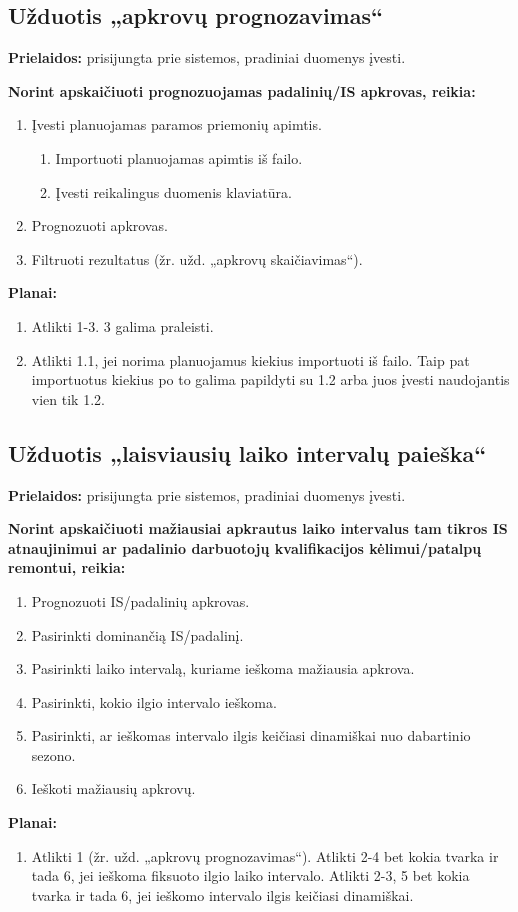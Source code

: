\subsection{Užduotis „apkrovų prognozavimas“}

\textbf{Prielaidos:} prisijungta prie sistemos, pradiniai duomenys įvesti.

\textbf{Norint apskaičiuoti prognozuojamas padalinių/IS apkrovas, reikia:}
\begin{enumerate}
  \item Įvesti planuojamas paramos priemonių apimtis.
  \begin{enumerate}
    \item Importuoti planuojamas apimtis iš failo.
    \item Įvesti reikalingus duomenis klaviatūra.
  \end{enumerate}
  
  \item Prognozuoti apkrovas.
  \item Filtruoti rezultatus (žr. užd. „apkrovų skaičiavimas“).
\end{enumerate}

\vspace{1cm}
\textbf{Planai:}
\begin{enumerate}
  \item Atlikti 1-3. 3 galima praleisti.
  \item Atlikti 1.1, jei norima planuojamus kiekius importuoti iš failo. Taip pat importuotus
  kiekius po to galima papildyti su 1.2 arba juos įvesti naudojantis vien tik 1.2.
\end{enumerate}

\subsection{Užduotis „laisviausių laiko intervalų paieška“}

\textbf{Prielaidos:} prisijungta prie sistemos, pradiniai duomenys įvesti.

\textbf{Norint apskaičiuoti mažiausiai apkrautus laiko intervalus tam tikros IS atnaujinimui ar
padalinio darbuotojų kvalifikacijos kėlimui/patalpų remontui, reikia:}
\begin{enumerate}
  \item Prognozuoti IS/padalinių apkrovas.
  \item Pasirinkti dominančią IS/padalinį.
  \item Pasirinkti laiko intervalą, kuriame ieškoma mažiausia apkrova.
  \item Pasirinkti, kokio ilgio intervalo ieškoma.
  \item Pasirinkti, ar ieškomas intervalo ilgis keičiasi dinamiškai nuo dabartinio sezono.
  \item Ieškoti mažiausių apkrovų.
\end{enumerate}

\vspace{1cm}
\textbf{Planai:}
\begin{enumerate}
  \item Atlikti 1 (žr. užd. „apkrovų prognozavimas“). Atlikti 2-4 bet kokia tvarka ir tada 6,
  jei ieškoma fiksuoto ilgio laiko intervalo. Atlikti 2-3, 5 bet kokia tvarka ir tada 6, jei
  ieškomo intervalo ilgis keičiasi dinamiškai.
\end{enumerate}
